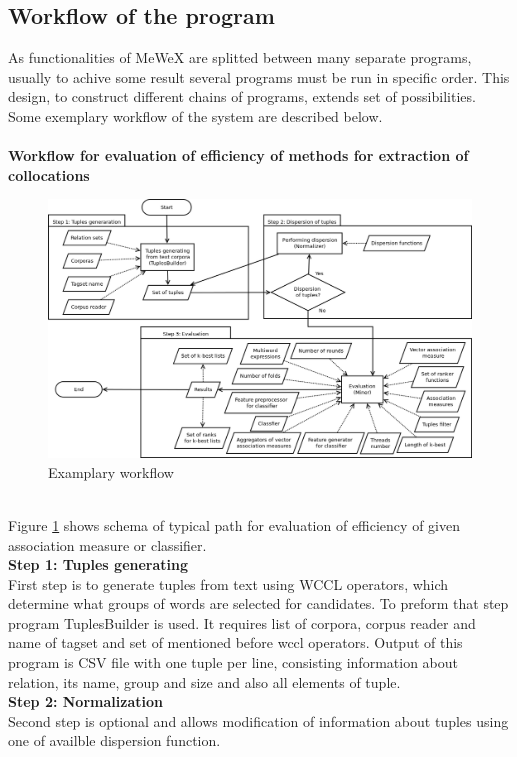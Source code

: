 \subsection{Workflow of the program} \label{mewex_workflow}
As functionalities of MeWeX are splitted between many separate programs, usually to achive some result several programs must be run in specific order. 
This design, to construct different chains of programs, extends set of possibilities. Some exemplary workflow of the system are described below. 
\\ \\\textbf{Workflow for evaluation of efficiency of methods for extraction of collocations}
\begin{figure}[ht]
	\centering
	\includegraphics[scale=0.4]{img/mewex_workflow1.png}
	\caption{Examplary workflow}
	\label{img_workflow1}
\end{figure}
\\ Figure \ref{img_workflow1} shows schema of typical path for evaluation of efficiency of given association measure or classifier.
\\ \textbf{Step 1: Tuples generating}\\
First step is to generate tuples from text using WCCL operators, which determine what groups of words are selected for candidates. 
To preform that step program TuplesBuilder is used. It requires list of corpora, corpus reader and name of tagset and 
set of mentioned before wccl operators. Output of this program is CSV file with one tuple per line, consisting information about relation, 
its name, group and size and also all elements of tuple.
\\ \textbf{Step 2: Normalization}\\
Second step is optional and allows modification of information about tuples using one of availble dispersion function. 
